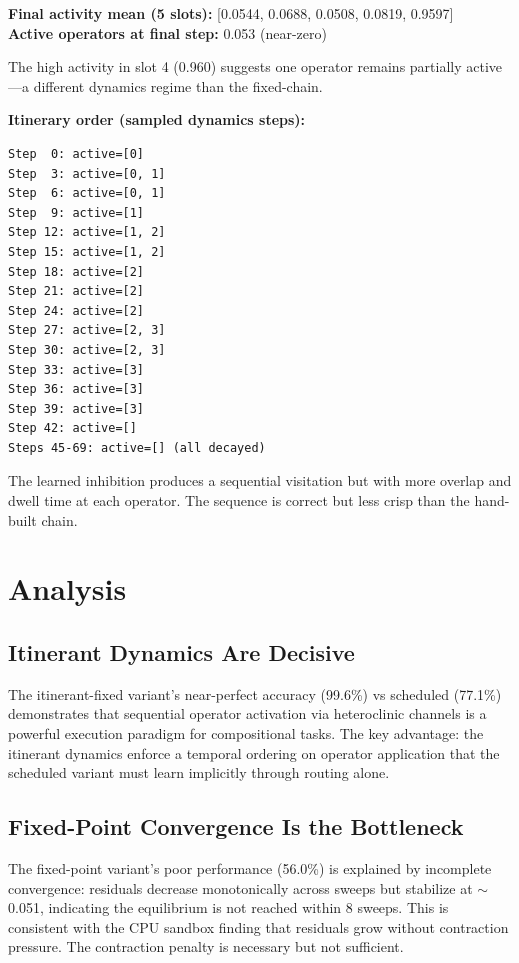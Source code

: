 \documentclass[11pt]{article}
\begin{document}
\textbf{Final activity mean (5 slots):} [0.0544, 0.0688, 0.0508, 0.0819, 0.9597] \\
\textbf{Active operators at final step:} 0.053 (near-zero)

The high activity in slot 4 (0.960) suggests one operator remains partially active---a different dynamics regime than the fixed-chain.

\textbf{Itinerary order (sampled dynamics steps):}
\begin{lstlisting}
Step  0: active=[0]
Step  3: active=[0, 1]
Step  6: active=[0, 1]
Step  9: active=[1]
Step 12: active=[1, 2]
Step 15: active=[1, 2]
Step 18: active=[2]
Step 21: active=[2]
Step 24: active=[2]
Step 27: active=[2, 3]
Step 30: active=[2, 3]
Step 33: active=[3]
Step 36: active=[3]
Step 39: active=[3]
Step 42: active=[]
Steps 45-69: active=[] (all decayed)
\end{lstlisting}
The learned inhibition produces a sequential visitation but with more overlap and dwell time at each operator. The sequence is correct but less crisp than the hand-built chain.

\section{Analysis}

\subsection{Itinerant Dynamics Are Decisive}
The itinerant-fixed variant's near-perfect accuracy (99.6\%) vs scheduled (77.1\%) demonstrates that sequential operator activation via heteroclinic channels is a powerful execution paradigm for compositional tasks. The key advantage: the itinerant dynamics enforce a temporal ordering on operator application that the scheduled variant must learn implicitly through routing alone.

\subsection{Fixed-Point Convergence Is the Bottleneck}
The fixed-point variant's poor performance (56.0\%) is explained by incomplete convergence: residuals decrease monotonically across sweeps but stabilize at $\sim$0.051, indicating the equilibrium is not reached within 8 sweeps. This is consistent with the CPU sandbox finding that residuals grow without contraction pressure. The contraction penalty is necessary but not sufficient.
\end{document}
